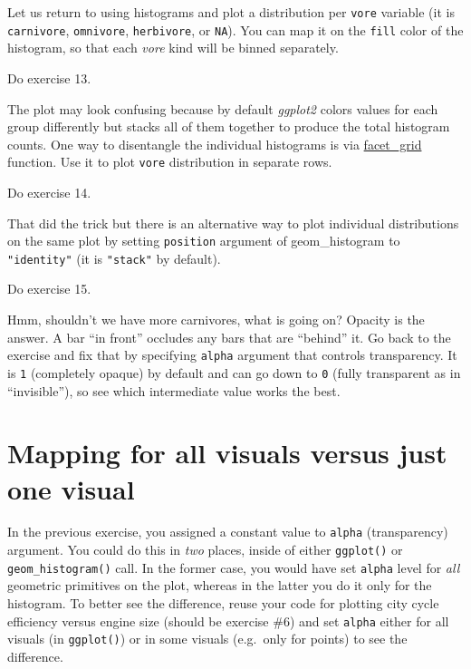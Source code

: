 \documentclass[
]{book}
\begin{document}
Let us return to using histograms and plot a distribution per \texttt{vore} variable (it is \texttt{carnivore}, \texttt{omnivore}, \texttt{herbivore}, or \texttt{NA}). You can map it on the \texttt{fill} color of the histogram, so that each \emph{vore} kind will be binned separately.

Do exercise 13.

The plot may look confusing because by default \emph{ggplot2} colors values for each group differently but stacks all of them together to produce the total histogram counts. One way to disentangle the individual histograms is via \href{https://ggplot2.tidyverse.org/reference/facet_grid.html}{facet\_grid} function. Use it to plot \texttt{vore} distribution in separate rows.

Do exercise 14.

That did the trick but there is an alternative way to plot individual distributions on the same plot by setting \texttt{position} argument of geom\_histogram to \texttt{"identity"} (it is \texttt{"stack"} by default).

Do exercise 15.

Hmm, shouldn't we have more carnivores, what is going on? Opacity is the answer. A bar ``in front'' occludes any bars that are ``behind'' it. Go back to the exercise and fix that by specifying \texttt{alpha} argument that controls transparency. It is \texttt{1} (completely opaque) by default and can go down to \texttt{0} (fully transparent as in ``invisible''), so see which intermediate value works the best.

\hypertarget{mapping-for-all-visuals-versus-just-one-visual}{%
\section{Mapping for all visuals versus just one visual}\label{mapping-for-all-visuals-versus-just-one-visual}}

In the previous exercise, you assigned a constant value to \texttt{alpha} (transparency) argument. You could do this in \emph{two} places, inside of either \texttt{ggplot()} or \texttt{geom\_histogram()} call. In the former case, you would have set \texttt{alpha} level for \emph{all} geometric primitives on the plot, whereas in the latter you do it only for the histogram. To better see the difference, reuse your code for plotting city cycle efficiency versus engine size (should be exercise \#6) and set \texttt{alpha} either for all visuals (in \texttt{ggplot()}) or in some visuals (e.g.~only for points) to see the difference.
\end{document}
